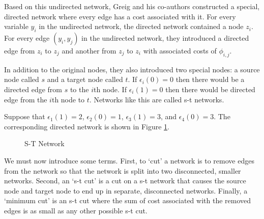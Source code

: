 Based on this undirected network, Greig and his co-authors constructed
a special, directed network where every edge has a cost associated
with it. For every variable $y_i$ in the undirected network, the
directed network contained a node $z_i$.  For every edge $(y_i, y_j)$ in the
undirected network, they introduced a directed edge from $z_i$ to $z_j$ and
another from $z_j$ to $z_i$ with associated costs of $\phi_{i,j}$.

In addition to the original nodes, they also introduced two special
nodes: a source node called $s$ and a target node called
$t$. If $\epsilon_i(0) = 0$ then there would be a directed edge from
$s$ to the $i$th node. If $\epsilon_i(1) = 0$ then there would be
directed edge from the $i$th node to $t$. Networks like this are
called s-t networks.

Suppose that $\epsilon_1(1)=2$, $\epsilon_2(0)=1$, $\epsilon_3(1)=3$,
and $\epsilon_4(0)=3$. The corresponding directed network is shown in
Figure \ref{fig:directed}. 

\begin{figure}[!h]
\centering

\caption{S-T Network}
\label{fig:directed}
\end{figure}

We must now introduce some terms. First, to `cut' a network is to
remove edges from the network so that the network is split into two
disconnected, smaller networks. Second, an `s-t cut' is a cut on a s-t
network that causes the source node and target node to end up in
separate, disconnected networks. Finally, a `minimum cut' is an s-t cut
where the sum of cost associated with the removed edges is as small as
any other possible s-t cut. 

